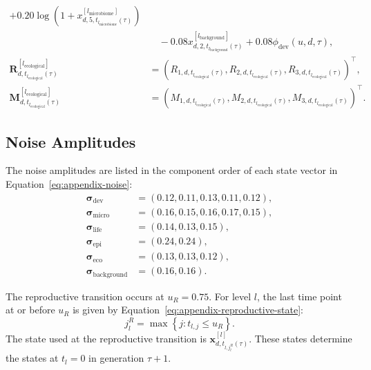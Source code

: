 \documentclass[11pt]{article}
\begin{document}
\begin{equation}
\begin{aligned}
+0.20\log\!\left(
1+x^{[l_{\mathrm{microbiome}}]}_{d,5,t_{l_{\mathrm{microbiome}}}(\tau)}
\right)\\
&\quad-
0.08x^{[l_{\mathrm{background}}]}_{d,2,t_{l_{\mathrm{background}}}(\tau)}
+0.08\phi_{\mathrm{dev}}(u,d,\tau),\\
\mathbf{R}^{[l_{\mathrm{ecological}}]}_{d,t_{l_{\mathrm{ecological}}}(\tau)}
&=
\left(
R_{1,d,t_{l_{\mathrm{ecological}}}(\tau)},
R_{2,d,t_{l_{\mathrm{ecological}}}(\tau)},
R_{3,d,t_{l_{\mathrm{ecological}}}(\tau)}
\right)^\top,\\
\mathbf{M}^{[l_{\mathrm{ecological}}]}_{d,t_{l_{\mathrm{ecological}}}(\tau)}
&=
\left(
M_{1,d,t_{l_{\mathrm{ecological}}}(\tau)},
M_{2,d,t_{l_{\mathrm{ecological}}}(\tau)},
M_{3,d,t_{l_{\mathrm{ecological}}}(\tau)}
\right)^\top.
\end{aligned}
\label{eq:appendix-eco-rm}
\end{equation}

\subsection{Noise Amplitudes}
The noise amplitudes are listed in the component order of each state vector in Equation~\ref{eq:appendix-noise}:
\begin{equation}
\begin{aligned}
\boldsymbol{\sigma}_{\mathrm{dev}}
&=(0.12,0.11,0.13,0.11,0.12),\\
\boldsymbol{\sigma}_{\mathrm{micro}}
&=(0.16,0.15,0.16,0.17,0.15),\\
\boldsymbol{\sigma}_{\mathrm{life}}
&=(0.14,0.13,0.15),\\
\boldsymbol{\sigma}_{\mathrm{epi}}
&=(0.24,0.24),\\
\boldsymbol{\sigma}_{\mathrm{eco}}
&=(0.13,0.13,0.12),\\
\boldsymbol{\sigma}_{\mathrm{background}}
&=(0.16,0.16).
\end{aligned}
\label{eq:appendix-noise}
\end{equation}

The reproductive transition occurs at $u_R=0.75$. For level $l$, the last time point at or before $u_R$ is given by Equation~\ref{eq:appendix-reproductive-state}:
\begin{equation}
j_l^R
=
\max\left\{
j:t_{l,j}\leq u_R
\right\}.
\label{eq:appendix-reproductive-state}
\end{equation}
The state used at the reproductive transition is $\mathbf{x}^{[l]}_{d,t_{l,j_l^R}(\tau)}$. These states determine the states at $t_l=0$ in generation $\tau+1$.
\end{document}
